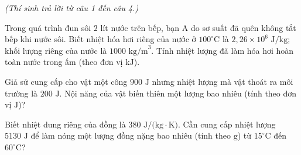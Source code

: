 \vspace{0.15cm}
\begin{flushleft}
	{\color{blue!50!green}}
	\textit{\small (Thí sinh trả lời từ câu 1 đến câu 4.)}
\end{flushleft}
\setcounter{ex}{0}

\begin{ex}
	Trong quá trình đun sôi $2\text{ lít}$ nước trên bếp, bạn A do sơ suất đã quên không tắt bếp khi nước sôi. Biết nhiệt hóa hơi riêng của nước ở $100^\circ\text{C}$ là $2{,}26 \times 10^6\text{ J/kg}$; khối lượng riêng của nước là $1000\text{ kg/m}^3$. Tính nhiệt lượng đã làm hóa hơi hoàn toàn nước trong ấm (theo đơn vị $\text{kJ}$).

	\par{}
\end{ex}

\begin{ex}
	Giả sử cung cấp cho vật một công $900\text{ J}$ nhưng nhiệt lượng mà vật thoát ra môi trường là $200\text{ J}$. Nội năng của vật biến thiên một lượng bao nhiêu (tính theo đơn vị $\text{J}$)?

	\par{}
\end{ex}

\begin{ex}
	Biết nhiệt dung riêng của đồng là $380\text{ J/(kg}\cdot\text{K)}$. Cần cung cấp nhiệt lượng $5130\text{ J}$ để làm nóng một lượng đồng nặng bao nhiêu (tính theo $\text{g}$) từ $15^\circ\text{C}$ đến $60^\circ\text{C}$?

	\par{}
\end{ex}

